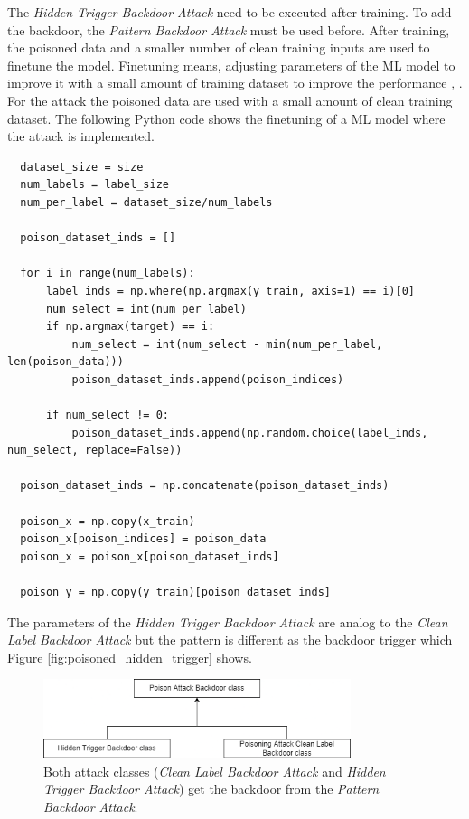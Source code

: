 The \textit{Hidden Trigger Backdoor Attack} \cite{DBLP:journals/corr/abs-1910-00033} need to be executed after training. To add the backdoor, the \textit{Pattern Backdoor Attack} must be
used before. After training, the poisoned data and a smaller number of clean training inputs are used to finetune the model. Finetuning means, adjusting parameters of the ML model to
improve it with a small amount of training dataset to improve the performance \cite{DBLP:conf/acl/LiWTTTPBCA20}, \cite{DBLP:journals/corr/abs-2112-08691}. For the attack the poisoned data
are used with a small amount of clean training dataset. The following Python code shows the finetuning of a ML model where the attack is implemented.

\begin{lstlisting}
  dataset_size = size
  num_labels = label_size
  num_per_label = dataset_size/num_labels

  poison_dataset_inds = []

  for i in range(num_labels):
      label_inds = np.where(np.argmax(y_train, axis=1) == i)[0]
      num_select = int(num_per_label)
      if np.argmax(target) == i:
          num_select = int(num_select - min(num_per_label, len(poison_data)))
          poison_dataset_inds.append(poison_indices)

      if num_select != 0:
          poison_dataset_inds.append(np.random.choice(label_inds, num_select, replace=False))

  poison_dataset_inds = np.concatenate(poison_dataset_inds)

  poison_x = np.copy(x_train)
  poison_x[poison_indices] = poison_data
  poison_x = poison_x[poison_dataset_inds]

  poison_y = np.copy(y_train)[poison_dataset_inds]
\end{lstlisting}

The parameters of the \textit{Hidden Trigger Backdoor Attack} are analog to the \textit{Clean Label Backdoor Attack} but the pattern is different as the backdoor trigger which Figure \ref{fig:poisoned_hidden_trigger} shows.

\begin{figure}[ht!]
  \centering
  \includegraphics[width=9cm]{pictures/attack_relationship.png}
  \caption{Both attack classes (\textit{Clean Label Backdoor Attack} and \textit{Hidden Trigger Backdoor Attack}) get the backdoor from the \textit{Pattern Backdoor Attack}.}
  \label{fig:attack_relationship}
\end{figure}


